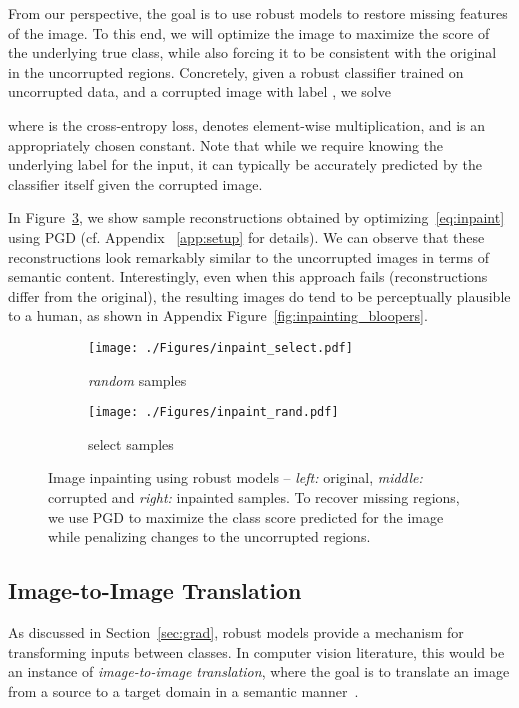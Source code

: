 \documentclass{article}
\begin{document}
{From our perspective, the goal is to use robust models to restore missing features
of the image. To this end, we will optimize the image to 
maximize the score of the underlying true class, while also 
forcing it to be consistent with the original in the uncorrupted 
regions. Concretely, given a robust classifier trained on 
uncorrupted data, and a corrupted image 
with label , we solve

where 
is the cross-entropy loss,  denotes element-wise multiplication, and  is an appropriately chosen constant.
Note that while we require knowing the underlying label  for the input, it can typically be
accurately predicted by the classifier itself given the corrupted image.

In Figure~\ref{fig:inpainting}, we show sample reconstructions obtained by
optimizing~\eqref{eq:inpaint} using PGD (cf. Appendix
~\ref{app:setup} for details). We can observe that these reconstructions
look remarkably similar to the uncorrupted images in terms of semantic 
content. Interestingly, even when this approach fails (reconstructions
differ from the original), the resulting images do tend to be perceptually
plausible to a human, as shown in Appendix Figure~\ref{fig:inpainting_bloopers}.


\begin{figure}[!h]
	\centering
	\begin{subfigure}[b]{0.49\textwidth}
	\centering
	\texttt{[image: ./Figures/inpaint\_select.pdf]}
	\caption{\emph{random} samples}
	\label{fig:inpaint_rand}
	\end{subfigure}
\hfil
	\begin{subfigure}[b]{0.49\textwidth}
	\centering
	\texttt{[image: ./Figures/inpaint\_rand.pdf]}
	\caption{select samples}
	\label{fig:inpaint_select}
\end{subfigure}
	\caption{Image inpainting using robust models -- \textit{left:} original,
	\textit{middle:} corrupted and \textit{right:} inpainted samples. 
	To recover 
	missing regions, we use PGD to maximize the class score predicted for the 
	image while penalizing changes to 
    the uncorrupted regions. }
	\label{fig:inpainting}
\end{figure}

 
\subsection{Image-to-Image Translation}
\label{sec:horse2zebra}
As discussed in Section~\ref{sec:grad}, robust 
models provide a mechanism for transforming inputs between classes.
In computer vision literature, this would be an instance of
{\em image-to-image translation}, where the goal is to translate an image
from a source to a target
domain in a semantic manner~\cite{hertzmann2001image}.

}
\end{document}
